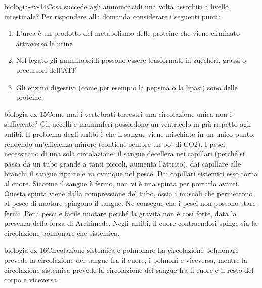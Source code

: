 \documentclass[preview]{standalone}
\begin{document}
\begin{snippetexercise}{biologia-ex-14}{Cosa succede agli amminoacidi una volta assorbiti a
    livello intestinale? Per rispondere alla domanda
    considerare i seguenti punti:}
    \begin{enumerate}
        \item L'urea è un prodotto del metabolismo delle proteine che
            viene eliminato attraverso le urine
        \item Nel fegato gli amminoacidi possono essere trasformati in
        zuccheri, grassi o precursori dell'ATP
        \item Gli enzimi digestivi (come per esempio la pepsina o la
        lipasi) sono delle proteine.
    \end{enumerate}

\end{snippetexercise}

\begin{snippetexercise}{biologia-ex-15}{Come mai i vertebrati terrestri una circolazione unica non è sufficiente?}
    Gli uccelli e mammiferi possiedono un ventricolo in più rispetto agli anfibi.
    Il problema degli anfibi è che il sangue viene mischiato in un unico punto, rendendo un'efficienza minore (contiene sempre un po' di CO2).
    I pesci necessitano di una sola circolazione: il sangue decellera nei capillari (perché sì passa da un tubo grande a tanti piccoli, aumenta l'attrito),
    dai capillare alle branchi il sangue riparte e va ovunque nel pesce. Dai capillari sistemici esso torna al cuore.
    Siccome il sangue è fermo, non vi è una spinta per portarlo avanti.
    Questa spinta viene dalla compressione del tubo, ossia i muscoli che permettono al pesce di nuotare
    spingono il sangue. Ne consegue che i pesci non possono stare fermi.
    Per i pesci è facile nuotare perché la gravità non è così forte, data la presenza della forza di Archimede.
    Negli anfibi, il cuore contraendosi spinge sia la circolazione polmonare che sistemica.
\end{snippetexercise}

\begin{snippetexercise}{biologia-ex-16}{Circolazione sistemica e polmonare}
    La circolazione polmonare prevede la circolazione del sangue fra il cuore, i polmoni e viceversa,
    mentre la circolazione sistemica prevede la circolazione del sangue fra il cuore e il resto del corpo e viceversa.
\end{snippetexercise}
\end{document}
